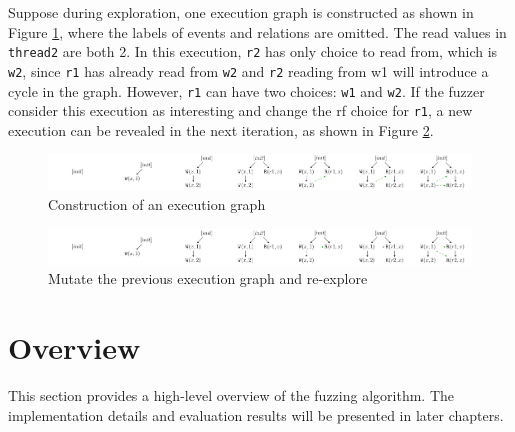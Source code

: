 Suppose during exploration, one execution graph is constructed as shown in Figure \ref{example_construct}, where the labels of events and relations are omitted. The read values in \texttt{thread2} are both 2. In this execution, \texttt{r2} has only choice to read from, which is \texttt{w2}, since \texttt{r1} has already read from \texttt{w2} and \texttt{r2} reading from w1 will introduce a cycle in the graph. However, \texttt{r1} can have two choices: \texttt{w1} and \texttt{w2}. If the fuzzer consider this execution as interesting and change the rf choice for \texttt{r1}, a new execution can be revealed in the next iteration, as shown in Figure \ref{example_mutate}. 

\begin{figure}[htbp] 
    \centering
    \includegraphics[scale=0.52]{figure/exec-graph/example_construct.pdf} 
    \caption{Construction of an execution graph} 
    \label{example_construct} 
\end{figure}

\begin{figure}[htbp] 
    \centering
    \includegraphics[scale=0.52]{figure/exec-graph//example_mutate.pdf} 
    \caption{Mutate the previous execution graph and re-explore} 
    \label{example_mutate} 
\end{figure}


\section{Overview}


This section provides a high-level overview of the fuzzing algorithm. The implementation details and evaluation results will be presented in later chapters.


